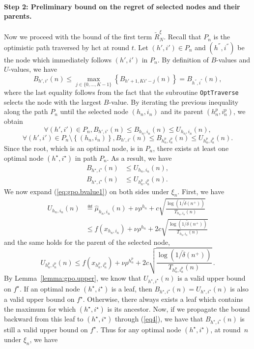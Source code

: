 \paragraph{Step 2: Preliminary bound on the regret of selected nodes and their parents.}
Now we proceed with the bound of the first term $\tilde{R}_N^{\xi}$.
Recall that $P_n$ is the optimistic path traversed by \gls{hct} at round $t$.
Let $(h',i')\in P_n$ and $(h^{''},i^{''})$ be the node which immediately follows $(h',i')$ in $P_n$. By definition of $B$-values and $U$-values, we have
\begin{equation} \label{eq4}
B_{h',i'}(n) \leq \underset{j\in\{0,\ldots,K-1\}}{\max} \left\{B_{h'+1,Ki'-j}(n)\right\} = B_{h^{''},i^{''}}(n),
\end{equation}
where the last equality follows from the fact that the subroutine \texttt{OptTraverse} selects the node with the largest $B$-value. By iterating the previous inequality along  the path $P_n$ until the selected node $(h_n,i_n)$ and its parent $(h_n^p,i_n^p)$, we obtain
\[
\forall (h',i')\in P_n, B_{h',i'}(n) \leq B_{h_n,i_n}(n) \leq U_{h_n,i_n}(n),
\]
\[
\forall (h',i')\in P_n\setminus \left\{(h_n,i_n)\right\}, B_{h',i'}(n) \leq B_{h_n^p,i_n^p}(n) \leq U_{h_n^p,i_n^p}(n).
\]
Since the root, which is an optimal node, is in $P_n$, there exists at least one optimal node $(h^\star,i^\star)$ in path $P_n$. As a result, we have
\begin{align}
    B_{h^\star,i^\star}(n) & \leq U_{h_n,i_n}(n), \label{eq:gpo.bvalue1} \\
    B_{h^\star,i^\star}(n) & \leq U_{h_n^p,i_n^p}(n). \label{eq:gpo.bvalue2}
\end{align}
We now expand (\ref{eq:gpo.bvalue1}) on both sides under $\xi_n$. First, we have
\begin{align}
    U_{h_n,i_n}(n) & \eqdef \hat{\mu}_{h_n,i_n}(n) + \nu\rho^{h_n} +     c\sqrt{\frac{\log(1/\tilde{\delta}(n^+))}{T_{h_n,i_n}(n)}} \nonumber \\
                   &\leq f(x_{h_n,i_n}) + \nu\rho^{h_n} + 2c\sqrt{\frac{\log(1/\tilde{\delta}(n^+))}{T_{h_n,i_n}(n)}} \label{eq:gpo.ucb}
\end{align}
and the same holds for the parent of the selected node,
\begin{equation*}
    U_{h_n^p,i_n^p}(n) \leq f(x_{h_n^p,i_n^p}) +\nu\rho^{h_n^p} + 2c\sqrt{\frac{\log(1/\tilde{\delta}(n^+))}{T_{h_n^p,i_n^p}(n)}}\,.
\end{equation*}
By Lemma~\ref{lemma:gpo.upper}, we know that $U_{h^\star,i^\star}(n)$ is a valid upper bound on $f^\star$. If an optimal node $(h^\star,i^\star)$ is a leaf, then $B_{h^\star,i^\star}(n)=U_{h^\star,i^\star}(n)$ is also a valid upper bound on $f^\star$. Otherwise, there always exists a leaf which contains the maximum for which $(h^\star,i^\star)$ is its ancestor. Now, if we propagate the bound backward from this leaf to $(h^\star,i^\star)$ through (\ref{eq4}), we have that $B_{h^\star,i^\star}(n)$ is still a valid upper bound on $f^\star$. Thus for any optimal node $(h^\star,i^\star)$, at round~$n$ under $\xi_n$, we have
